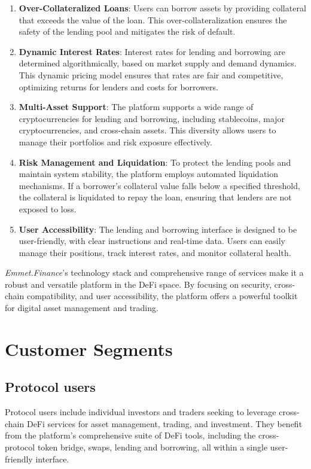 \documentclass[12pt, a4paper]{article}
\begin{document}
\begin{enumerate}
    \item \textbf{Over-Collateralized Loans}: Users can borrow assets by providing collateral that exceeds the value of the loan. This over-collateralization ensures the safety of the lending pool and mitigates the risk of default.
    \item \textbf{Dynamic Interest Rates}: Interest rates for lending and borrowing are determined algorithmically, based on market supply and demand dynamics. This dynamic pricing model ensures that rates are fair and competitive, optimizing returns for lenders and costs for borrowers.
    \item \textbf{Multi-Asset Support}: The platform supports a wide range of cryptocurrencies for lending and borrowing, including stablecoins, major cryptocurrencies, and cross-chain assets. This diversity allows users to manage their portfolios and risk exposure effectively.
    \item \textbf{Risk Management and Liquidation}: To protect the lending pools and maintain system stability, the platform employs automated liquidation mechanisms. If a borrower's collateral value falls below a specified threshold, the collateral is liquidated to repay the loan, ensuring that lenders are not exposed to loss.
    \item \textbf{User Accessibility}: The lending and borrowing interface is designed to be user-friendly, with clear instructions and real-time data. Users can easily manage their positions, track interest rates, and monitor collateral health.
\end{enumerate}

\textit{Emmet.Finance}'s technology stack and comprehensive range of services make it a robust and versatile platform in the DeFi space. By focusing on security, cross-chain compatibility, and user accessibility, the platform offers a powerful toolkit for digital asset management and trading.


\section{Customer Segments}

\subsection{Protocol users}

Protocol users include individual investors and traders seeking to leverage cross-chain DeFi services for asset management, trading, and investment. They benefit from the platform's comprehensive suite of DeFi tools, including the cross-protocol token bridge, swaps, lending and borrowing, all within a single user-friendly interface.
\end{document}
